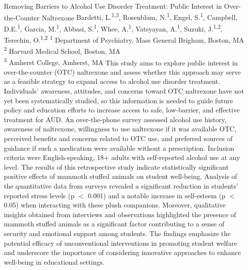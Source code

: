 \makeabstract
    {
    Removing Barriers to Alcohol Use Disorder Treatment: Public Interest in Over-the-Counter Naltrexone
    }
    {
    Bardetti, L.\textsuperscript{1,3}, Rosenblum, N.\textsuperscript{1}, Engel, S.\textsuperscript{1}, Campbell, D.E.\textsuperscript{1}, Garcia, M.\textsuperscript{1}, Abbasi, S.\textsuperscript{1},  Whee, A.\textsuperscript{1}, Vatsyayan, A.\textsuperscript{1}, Suzuki, J.\textsuperscript{1,2}, Terechin, O.\textsuperscript{1,2}
    }
    {
    \textsuperscript{1} Department of Psychiatry, Mass General Brigham, Boston, MA\\
\textsuperscript{2} Harvard Medical School, Boston, MA\\
\textsuperscript{3} Amherst College, Amherst, MA
    }
    {
    This study aims to explore public interest in over-the-counter (OTC) naltrexone and assess whether this approach may serve as a feasible strategy to expand access to alcohol use disorder treatment. Individuals{\textquoteright} awareness, attitudes, and concerns toward OTC naltrexone have not yet been systematically studied, so this information is needed to guide future policy and education efforts to increase access to safe, low-barrier, and effective treatment for AUD.
    }
    {
    An over-the-phone survey assessed alcohol use history, awareness of naltrexone, willingness to use naltrexone if it was available OTC, perceived benefits and concerns related to OTC use, and preferred sources of guidance if such a medication were available without a prescription. Inclusion criteria were English-speaking, 18+ adults with self-reported alcohol use at any level.
    }
    {
    The results of this retrospective study indicate statistically significant positive effects of mammoth stuffed animals on student well-being. Analysis of the quantitative data from surveys revealed a significant reduction in students' reported stress levels (p \ensuremath{<} 0.001) and a notable increase in self-esteem (p \ensuremath{<} 0.05) when interacting with these plush companions. Moreover, qualitative insights obtained from interviews and observations highlighted the presence of mammoth stuffed animals as a significant factor contributing to a sense of security and emotional support among students. The findings emphasize the potential efficacy of unconventional interventions in promoting student welfare and underscore the importance of considering innovative approaches to enhance well-being in educational settings.
    }

